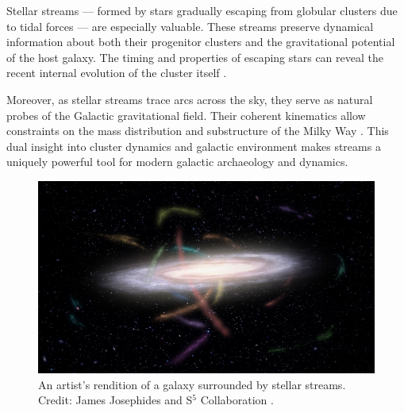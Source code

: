 
    

    Stellar streams — formed by stars gradually escaping from globular clusters due to tidal forces — are especially valuable. These streams preserve dynamical information about both their progenitor clusters and the gravitational potential of the host galaxy. The timing and properties of escaping stars can reveal the recent internal evolution of the cluster itself \citep{1972ApJ...178..623T,1995AJ....109.2553G}. 

    Moreover, as stellar streams trace arcs across the sky, they serve as natural probes of the Galactic gravitational field. Their coherent kinematics allow constraints on the mass distribution and substructure of the Milky Way \citep{2011MNRAS.417..198V,2023ApJ...954..195N}. This dual insight into cluster dynamics and galactic environment makes streams a uniquely powerful tool for modern galactic archaeology and dynamics.

    \begin{figure}
        \centering
        \includegraphics[width=\linewidth]{images/S5MilkywayStreams.jpg}
        \caption{An artist's rendition of a galaxy surrounded by stellar streams. Credit: James Josephides and S$^5$ Collaboration \citep{2019MNRAS.490.3508L}.}
        \label{fig:S5MilkywayStreams}
    \end{figure}

